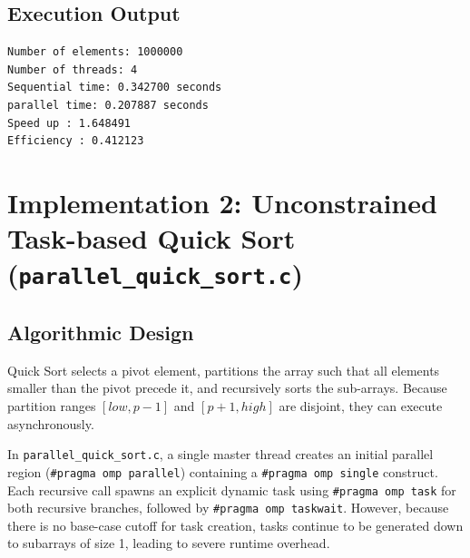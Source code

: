 \documentclass[12pt]{article}
\begin{document}
\subsection{Execution Output}
\begin{lstlisting}[style=output, caption={Console Output of \texttt{parallel\_merger\_sort.c}}]
Number of elements: 1000000
Number of threads: 4
Sequential time: 0.342700 seconds
parallel time: 0.207887 seconds
Speed up : 1.648491
Efficiency : 0.412123
\end{lstlisting}

\section{Implementation 2: Unconstrained Task-based Quick Sort (\texttt{parallel\_quick\_sort.c})}

\subsection{Algorithmic Design}
Quick Sort selects a pivot element, partitions the array such that all elements smaller than the pivot precede it, and recursively sorts the sub-arrays. Because partition ranges $[low, p-1]$ and $[p+1, high]$ are disjoint, they can execute asynchronously.

In \texttt{parallel\_quick_sort.c}, a single master thread creates an initial parallel region (\texttt{\#pragma omp parallel}) containing a \texttt{\#pragma omp single} construct. Each recursive call spawns an explicit dynamic task using \texttt{\#pragma omp task} for both recursive branches, followed by \texttt{\#pragma omp taskwait}. However, because there is no base-case cutoff for task creation, tasks continue to be generated down to subarrays of size 1, leading to severe runtime overhead.
\end{document}
